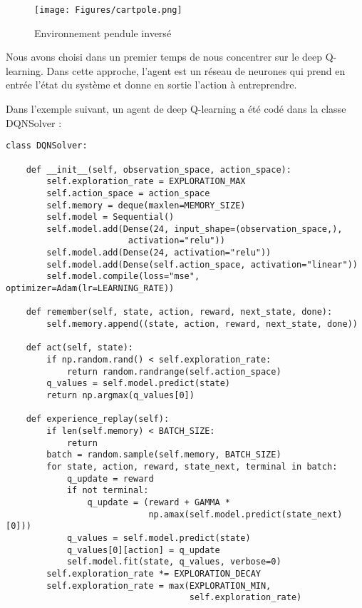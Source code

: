 \documentclass[11pt]{article}
\begin{document}
\begin{latex}
\begin{figure}[ht]
\centering
\texttt{[image: Figures/cartpole.png]}
\caption[cartpole]{Environnement pendule inversé}
\label{fig:cartpole}
\end{figure}
\end{latex}

Nous avons choisi dans un premier temps de nous concentrer sur le deep Q-learning.
Dans cette approche, l'agent est un réseau de neurones qui prend en entrée l'état du système et
donne en sortie l'action à entreprendre.


Dans l'exemple suivant, un agent de deep Q-learning a été codé dans la classe DQNSolver :


\begin{verbatim}
class DQNSolver:

    def __init__(self, observation_space, action_space):
        self.exploration_rate = EXPLORATION_MAX
        self.action_space = action_space
        self.memory = deque(maxlen=MEMORY_SIZE)
        self.model = Sequential()
        self.model.add(Dense(24, input_shape=(observation_space,),
                        activation="relu"))
        self.model.add(Dense(24, activation="relu"))
        self.model.add(Dense(self.action_space, activation="linear"))
        self.model.compile(loss="mse", optimizer=Adam(lr=LEARNING_RATE))

    def remember(self, state, action, reward, next_state, done):
        self.memory.append((state, action, reward, next_state, done))

    def act(self, state):
        if np.random.rand() < self.exploration_rate:
            return random.randrange(self.action_space)
        q_values = self.model.predict(state)
        return np.argmax(q_values[0])

    def experience_replay(self):
        if len(self.memory) < BATCH_SIZE:
            return
        batch = random.sample(self.memory, BATCH_SIZE)
        for state, action, reward, state_next, terminal in batch:
            q_update = reward
            if not terminal:
                q_update = (reward + GAMMA * 
                            np.amax(self.model.predict(state_next)[0]))
            q_values = self.model.predict(state)
            q_values[0][action] = q_update
            self.model.fit(state, q_values, verbose=0)
        self.exploration_rate *= EXPLORATION_DECAY
        self.exploration_rate = max(EXPLORATION_MIN,
                                    self.exploration_rate)
\end{verbatim}
\end{document}

